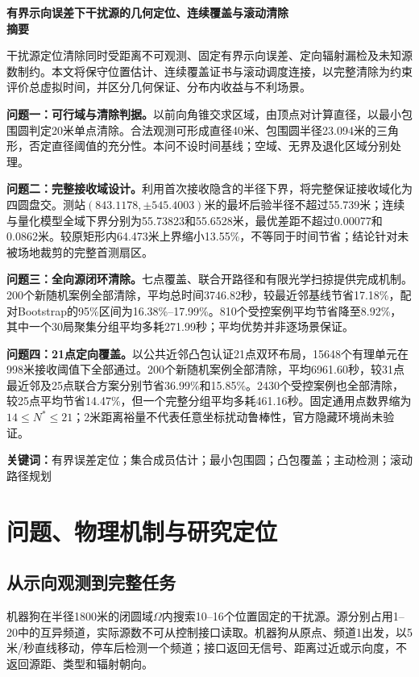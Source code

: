 \documentclass[UTF8,a4paper,zihao=-4,fontset=mac]{ctexart}
\begin{document}
\begin{center}
{\bfseries 有界示向误差下干扰源的几何定位、连续覆盖与滚动清除}\\[8pt]
{\large\bfseries 摘\quad 要}
\end{center}
干扰源定位清除同时受距离不可观测、固定有界示向误差、定向辐射漏检及未知源数制约。本文将保守位置估计、连续覆盖证书与滚动调度连接，以完整清除为约束评价总虚拟时间，并区分几何保证、分布内收益与不利场景。

\textbf{问题一：可行域与清除判据。}以前向角锥交求区域，由顶点对计算直径，以最小包围圆判定20米单点清除。合法观测可形成直径40米、包围圆半径23.094米的三角形，否定直径阈值的充分性。本问不设时间基线；空域、无界及退化区域分别处理。

\textbf{问题二：完整接收域设计。}利用首次接收隐含的半径下界，将完整保证接收域化为四圆盘交。测站$(843.1178,\pm545.4003)$米的最坏后验半径不超过55.739米；连续与量化模型全域下界分别为55.73823和55.6528米，最优差距不超过0.00077和0.0862米。较原矩形内64.473米上界缩小13.55\%，不等同于时间节省；结论针对未被场地裁剪的完整首测扇区。

\textbf{问题三：全向源闭环清除。}七点覆盖、联合开路径和有限光学扫掠提供完成机制。200个新随机案例全部清除，平均总时间3746.82秒，较最近邻基线节省17.18\%，配对Bootstrap的95\%区间为16.38\%--17.99\%。810个受控案例平均节省降至8.92\%，其中一个30局聚集分组平均多耗271.99秒；平均优势并非逐场景保证。

\textbf{问题四：21点定向覆盖。}以公共近邻凸包认证21点双环布局，15648个有理单元在998米接收阈值下全部通过。200个新随机案例全部清除，平均6961.60秒，较31点最近邻及25点联合方案分别节省36.99\%和15.85\%。2430个受控案例也全部清除，较25点平均节省14.47\%，但一个完整分组平均多耗461.16秒。固定通用点数界缩为$14\le N^*\le21$；2米距离裕量不代表任意坐标扰动鲁棒性，官方隐藏环境尚未验证。

\noindent\textbf{关键词：}有界误差定位；集合成员估计；最小包围圆；凸包覆盖；主动检测；滚动路径规划
\newpage

\section{问题、物理机制与研究定位}
\subsection{从示向观测到完整任务}
机器狗在半径1800米的闭圆域$\Omega$内搜索10--16个位置固定的干扰源。源分别占用1--20中的互异频道，实际源数不可从控制接口读取。机器狗从原点、频道1出发，以5米/秒直线移动，停车后检测一个频道；接口返回无信号、距离过近或示向度，不返回源距、类型和辐射朝向。
\end{document}

